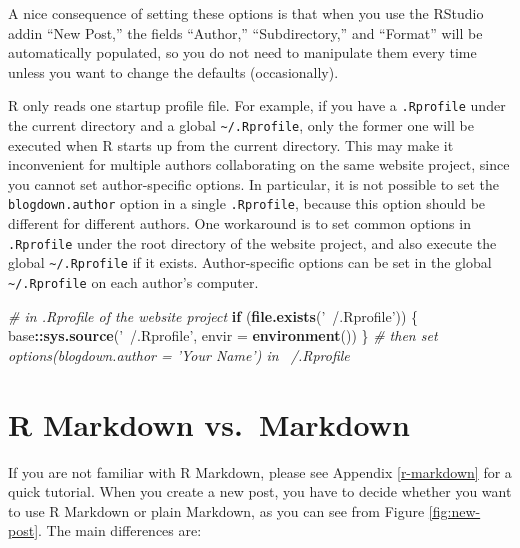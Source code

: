 \documentclass[12pt,]{krantz}
\makeatletter
\newenvironment{Shaded}{\begin{snugshade}}{\end{snugshade}}
\newcommand{\KeywordTok}[1]{\textcolor[rgb]{0.13,0.29,0.53}{\textbf{#1}}}
\newcommand{\DataTypeTok}[1]{\textcolor[rgb]{0.13,0.29,0.53}{#1}}
\newcommand{\StringTok}[1]{\textcolor[rgb]{0.31,0.60,0.02}{#1}}
\newcommand{\CommentTok}[1]{\textcolor[rgb]{0.56,0.35,0.01}{\textit{#1}}}
\newcommand{\ControlFlowTok}[1]{\textcolor[rgb]{0.13,0.29,0.53}{\textbf{#1}}}
\newcommand{\OperatorTok}[1]{\textcolor[rgb]{0.81,0.36,0.00}{\textbf{#1}}}
\newcommand{\NormalTok}[1]{#1}
\newenvironment{kframe}{%
\medskip{}
\setlength{\fboxsep}{.8em}
 \def\at@end@of@kframe{}%
 \ifinner\ifhmode%
  \def\at@end@of@kframe{\end{minipage}}%
  \begin{minipage}{\columnwidth}%
 \fi\fi%
 \def\FrameCommand##1{\hskip\@totalleftmargin \hskip-\fboxsep
 \colorbox{shadecolor}{##1}\hskip-\fboxsep
     \hskip-\linewidth \hskip-\@totalleftmargin \hskip\columnwidth}%
 \MakeFramed {\advance\hsize-\width
   \@totalleftmargin\z@ \linewidth\hsize
   \@setminipage}}%
 {\par\unskip\endMakeFramed%
 \at@end@of@kframe}
\renewenvironment{Shaded}{\begin{kframe}}{\end{kframe}}
\theoremstyle{definition}
\theoremstyle{definition}
\theoremstyle{definition}
\theoremstyle{remark}
\makeatother
\begin{document}
A nice consequence of setting these options is that when you use the
RStudio addin ``New Post,'' the fields ``Author,'' ``Subdirectory,'' and
``Format'' will be automatically populated, so you do not need to
manipulate them every time unless you want to change the defaults
(occasionally).

R only reads one startup profile file. For example, if you have a
\texttt{.Rprofile} under the current directory and a global
\texttt{\textasciitilde{}/.Rprofile}, only the former one will be
executed when R starts up from the current directory. This may make it
inconvenient for multiple authors collaborating on the same website
project, since you cannot set author-specific options. In particular, it
is not possible to set the \texttt{blogdown.author} option in a single
\texttt{.Rprofile}, because this option should be different for
different authors. One workaround is to set common options in
\texttt{.Rprofile} under the root directory of the website project, and
also execute the global \texttt{\textasciitilde{}/.Rprofile} if it
exists. Author-specific options can be set in the global
\texttt{\textasciitilde{}/.Rprofile} on each author's computer.

\begin{Shaded}
\begin{Highlighting}[]
\CommentTok{# in .Rprofile of the website project}
\ControlFlowTok{if}\NormalTok{ (}\KeywordTok{file.exists}\NormalTok{(}\StringTok{'~/.Rprofile'}\NormalTok{)) \{}
\NormalTok{  base}\OperatorTok{::}\KeywordTok{sys.source}\NormalTok{(}\StringTok{'~/.Rprofile'}\NormalTok{, }\DataTypeTok{envir =} \KeywordTok{environment}\NormalTok{())}
\NormalTok{\}}
\CommentTok{# then set options(blogdown.author = 'Your Name') in ~/.Rprofile}
\end{Highlighting}
\end{Shaded}

\section{R Markdown vs.~Markdown}\label{output-format}

If you are not familiar with R Markdown, please see
Appendix \ref{r-markdown} for a quick tutorial. When you create a new
post, you have to decide whether you want to use R Markdown or plain
Markdown, as you can see from Figure \ref{fig:new-post}.
The main differences are:
\end{document}
